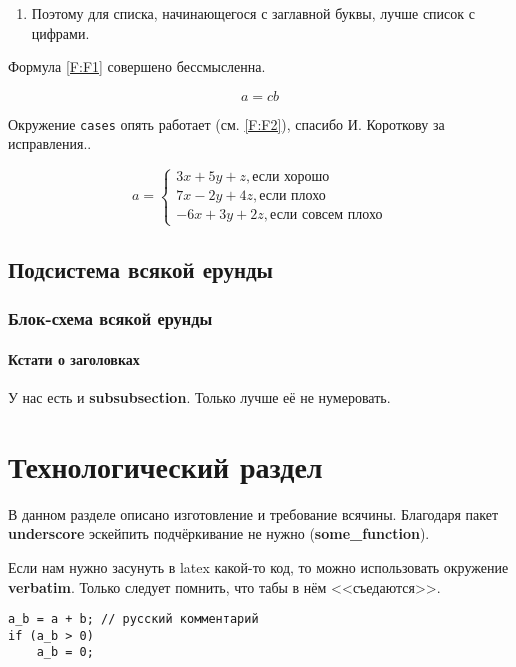 \documentclass[utf8]{G7-32} %
\newcommand{\Code}[1]{\textbf{#1}}
\begin{document}
\begin{enumerate}
\item Поэтому для списка, начинающегося с заглавной буквы, лучше список с цифрами.
\end{enumerate}

Формула \ref{F:F1} совершено бессмысленна.


\begin{equation}
a= cb
\label{F:F1}
\end{equation}


Окружение \texttt{cases} опять работает (см. \ref{F:F2}), спасибо И. Короткову за исправления..


\begin{equation}
a= \begin{cases}
 3x + 5y + z, \mbox{если хорошо} \\
 7x - 2y + 4z, \mbox{если плохо}\\
 -6x + 3y + 2z, \mbox{если совсем плохо}
\end{cases}
\label{F:F2}
\end{equation}

\section{Подсистема всякой ерунды}

\subsection{Блок-схема всякой ерунды}


\subsubsection*{Кстати о заголовках}

У нас есть и \Code{subsubsection}. Только лучше её не нумеровать.

\chapter{Технологический раздел}



В данном разделе описано изготовление и требование всячины. Благодаря пакет \Code{underscore} эскейпить подчёркивание  не нужно (\Code{some_function}).

Если нам нужно засунуть в latex какой-то код, то можно использовать окружение \Code{verbatim}. Только следует помнить, что табы в нём <<съедаются>>. 
\begin{verbatim}
a_b = a + b; // русский комментарий
if (a_b > 0)
    a_b = 0;
\end{verbatim}
\end{document}
